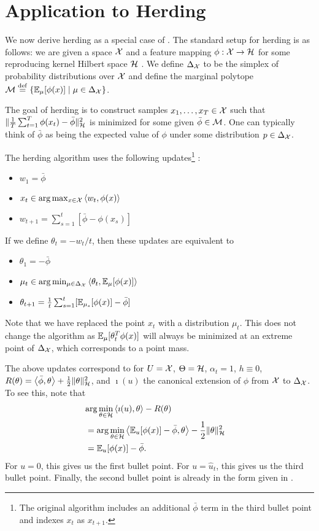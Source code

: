 \documentclass[paper.tex]{subfiles}
\begin{document}
\section{Application to Herding}
\label{sec:herding}

We now derive herding as a special case of \dual. The standard setup for herding is as follows: we are given a 
space $\mathcal{X}$ and a feature mapping $\phi : \mathcal{X} \to \mathcal{H}$ for some 
reproducing kernel Hilbert space $\mathcal{H}$ \cite{Hofmann:2008}. 
We define $\Delta_{\mathcal{X}}$ to be the simplex 
of probability distributions over $\mathcal{X}$ and define the marginal polytope 
$\mathcal{M} \stackrel{\mathrm{def}}{=} \{\mathbb{E}_{\mu}[\phi(x)] \mid \mu \in \Delta_{\mathcal{X}}\}$.

The goal of herding is to construct samples $x_1,\ldots,x_T \in \mathcal{X}$ 
such that $\|\frac{1}{T}\sum_{t=1}^T \phi(x_t)-\bar{\phi}\|_{\mathcal{H}}^2$ 
is minimized for some given $\bar{\phi} \in \mathcal{M}$. One can typically
think of $\bar \phi$ as being the expected value of $\phi$ under some 
distribution $p \in \Delta_{\mathcal{X}}$. 

The herding algorithm uses the following updates\footnote{The original 
algorithm includes an additional $\bar{\phi}$ term in the third bullet 
point and indexes $x_t$ as $x_{t+1}$.} \citep[][equations (1) and (2)]{Chen:2010a}:
\begin{itemize}
\item $w_1 = \bar{\phi}$
\item $x_t \in \arg\max_{x \in \mathcal{X}} \left\langle w_t, \phi(x) \right\rangle$
\item $w_{t+1} = \sum_{s=1}^t [\bar{\phi}-\phi(x_s)]$
\end{itemize}
If we define $\theta_t = -w_t/t$, then these updates are equivalent to
\begin{itemize}
\item $\theta_1 = -\bar{\phi}$
\item $\mu_t \in \arg\min_{\mu \in \Delta_{\mathcal{X}}} \left\langle \theta_t, \mathbb{E}_{\mu}[\phi(x)] \right\rangle$
\item $\theta_{t+1} = \frac{1}{t} \sum_{s=1}^t [\mathbb{E}_{\mu_s}[\phi(x)] - \bar{\phi}]$
\end{itemize}
Note that we have replaced the point $x_t$ with a distribution $\mu_t$. 
This does not change the algorithm as $\mathbb{E}_{\mu}[\theta_t^T\phi(x)]$ will 
always be minimized at an extreme point of $\Delta_{\mathcal{X}}$, which corresponds 
to a point mass.

The above updates correspond to \dual for $U = \mathcal{X}$, $\Theta = \mathcal{H}$, 
$\alpha_t = 1$, $h \equiv 0$, 
$R(\theta) = \left\langle \bar{\phi}, \theta \right\rangle + \frac{1}{2}\|\theta\|_{\mathcal{H}}^2$, 
and $\imath(u)$ the canonical extension of $\phi$ from $\mathcal{X}$ to $\Delta_{\mathcal{X}}$.
To see this, note that 
\begin{align}
\lefteqn{\arg\min_{\theta \in \sH} \ip{\imath(u)}{\theta} - R(\theta)} \\
 &= \arg\min_{\theta \in \sH} \ip{\bE_{u}[\phi(x)]-\bar{\phi}}{\theta} - \frac{1}{2}\|\theta\|_{\sH}^2 \\
 &= \bE_u[\phi(x)] - \bar{\phi}.
\end{align}
For $u = 0$, this gives us the first bullet point. For $u = \hat{u}_t$, 
this gives us the third bullet point. Finally, the second bullet point 
is already in the form given in \dual.
\end{document}
